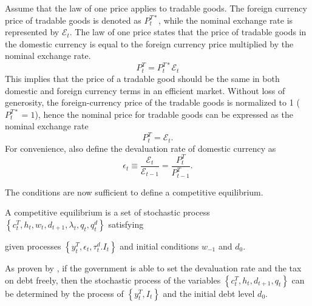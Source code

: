 Assume that the law of one price applies to tradable goods. The foreign currency price of tradable goods is denoted as $P^{T*}_t$, while the nominal exchange rate is represented by $\mathcal{E}_t$. The law of one price states that the price of tradable goods in the domestic currency is equal to the foreign currency price multiplied by the nominal exchange rate.
\begin{equation*}
    P^T_t = P^{T*}_t \mathcal{E}_t
\end{equation*}
This implies that the price of a tradable good should be the same in both domestic and foreign currency terms in an efficient market. Without loss of generosity, the foreign-currency price of the tradable goods is normalized to 1 ($P^{T*}_t = 1$), hence the nominal price for tradable goods can be expressed as the nominal exchange rate
\begin{equation}
    \label{eq:price-exrate}
    P^T_t = \mathcal{E}_t.
\end{equation}
For convenience, also define the devaluation rate of domestic currency as
\begin{equation}
    \label{eq:devaluation-rate}
    \epsilon_t \equiv \frac{\mathcal{E}_t}{\mathcal{E}_{t-1}} = \frac{P^T_t}{P^T_{t-1}}.
\end{equation}

The conditions are now sufficient to define a competitive equilibrium.
\begin{definition}
    A competitive equilibrium is a set of stochastic process $\left\{ c^T_t, h_t, w_t, d_{t+1}, \lambda_t, q_t, q^d_t \right\}$ satisfying
    
    given processes $\left\{ y^T_t, \epsilon_t, \tau^d_t. I_t \right\}$ and initial conditions $w_{-1}$ and $d_0$.
\end{definition}

As proven by \citet{Na-18}, if the government is able to set the devaluation rate and the tax on debt freely, then the stochastic process of the variables $\left\{ c^T_t, h_t, d_{t+1}, q_t \right\}$ can be determined by the process of $\left\{ y^T_t, I_t\right\}$ and the initial debt level $d_0$.

